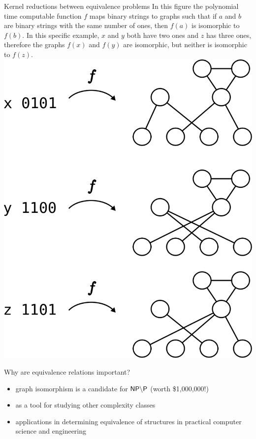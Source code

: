 \documentclass[final]{beamer}
\begin{document}
\begin{frame}{}
\begin{columns}[t]
\begin{column}{.3\linewidth}
      \begin{block}{\LARGE Kernel reductions between equivalence problems}
        \Large In this figure the polynomial time computable function $f$ maps
        binary strings to graphs such that if $a$ and $b$ are binary strings
        with the same number of ones, then $f(a)$ is isomorphic to $f(b)$. In
        this specific example, $x$ and $y$ both have two ones and $z$ has three
        ones, therefore the graphs $f(x)$ and $f(y)$ are isomorphic, but
        neither is isomorphic to $f(z)$.
        \includegraphics{images/rbc_gi.png}
      \end{block}

      \begin{block}{\LARGE Why are equivalence relations important?}
        \begin{itemize}
          \Large
        \item graph isomorphism is a candidate for ${\mathsf{NP}}\backslash{\ensuremath{\mathsf{P}}}$ (worth
          \$1,000,000!)
        \item as a tool for studying other complexity classes
        \item applications in determining equivalence of structures in
          practical computer science and engineering
        \end{itemize}
      \end{block}


\end{column}
\end{columns}
\end{frame}
\end{document}
